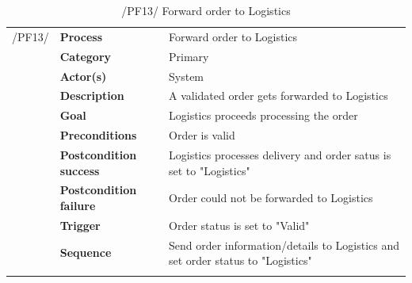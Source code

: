 \documentclass[11pt,a4paper,oneside,svgnames]{report}
\begin{document}
\begin{table}[H]
\centering
\begin{tabular}{p{1.5cm}p{3cm}p{8cm}}
\cellcolor{white}	 /PF13/	& \textbf{Process} & Forward order to Logistics\\ 
\cellcolor{white}		& \textbf{Category} & Primary\\
\cellcolor{white}		& \textbf{Actor(s)} & System\\ 
\cellcolor{white}		& \textbf{Description}	 & A validated order gets forwarded to Logistics\\ 
\cellcolor{white}		& \textbf{Goal} & Logistics proceeds processing the order\\
\cellcolor{white}		& \textbf{Preconditions} & Order is valid\\
\cellcolor{white}		& \textbf{Postcondition success} & Logistics processes delivery and order satus is set to "Logistics"\\
\cellcolor{white}		& \textbf{Postcondition failure} & Order could not be forwarded to Logistics\\
\cellcolor{white}		& \textbf{Trigger} & Order status is set to "Valid"\\
\cellcolor{white}		& \textbf{Sequence} & Send order information/details to Logistics and set order status to "Logistics"\\
\cellcolor{white}\hfill \\
\end{tabular}
\caption{/PF13/ Forward order to Logistics}
\label{tab:pf13}
\end{table}
\end{document}
